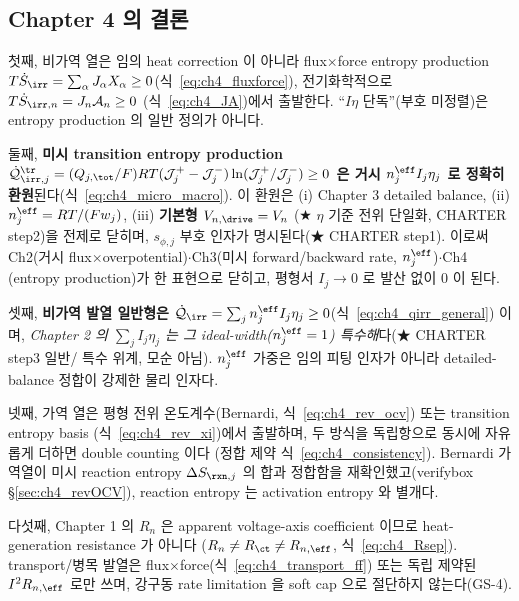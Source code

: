 \subsection{Chapter 4 의 결론}\label{sec:ch4_concl}
첫째, 비가역 열은 임의 heat correction 이 아니라 flux$\times$force entropy production $T\dot S_\irr=\sum_\alpha
J_\alpha X_\alpha\ge0$(식~\eqref{eq:ch4_fluxforce}), 전기화학적으로 $T\dot S_{\irr,n}=J_n\mathcal A_n\ge0$
(식~\eqref{eq:ch4_JA})에서 출발한다. ``$I\eta$ 단독''(부호 미정렬)은 entropy production 의 일반 정의가 아니다.

둘째, \textbf{미시 transition entropy production $\dot{\mathcal Q}_{\irr,j}^{\tr}=(Q_{j,\tot}/F)RT(\mathcal J_j^+-\mathcal J_j^-)
\ln(\mathcal J_j^+/\mathcal J_j^-)\ge0$ 은 거시 $n_j^{\eff}I_j\eta_j$ 로 정확히 환원}된다(식~\eqref{eq:ch4_micro_macro}).
이 환원은 (i) Chapter 3 detailed balance, (ii) $n_j^{\eff}=RT/(Fw_j)$, (iii) \textbf{기본형 $V_{n,\drive}=V_n$}
(★ $\eta$ 기준 전위 단일화, CHARTER step2)을 전제로 닫히며, $s_{\phi,j}$ 부호 인자가 명시된다(★ CHARTER step1).
이로써 Ch2(거시 flux$\times$overpotential)$\cdot$Ch3(미시 forward/backward rate, $n_j^{\eff}$)$\cdot$Ch4
(entropy production)가 한 표현으로 닫히고, 평형서 $I_j\to0$ 로 발산 없이 0 이 된다.

셋째, \textbf{비가역 발열 일반형은 $\dot{\mathcal Q}_\irr=\sum_j n_j^{\eff}I_j\eta_j\ge0$}(식~\eqref{eq:ch4_qirr_general})
이며, \emph{Chapter 2 의 $\sum_j I_j\eta_j$ 는 그 ideal-width($n_j^{\eff}=1$) 특수해}다(★ CHARTER step3 일반/
특수 위계, 모순 아님). $n_j^{\eff}$ 가중은 임의 피팅 인자가 아니라 detailed-balance 정합이 강제한 물리 인자다.

넷째, 가역 열은 평형 전위 온도계수(Bernardi, 식~\eqref{eq:ch4_rev_ocv}) 또는 transition entropy basis
(식~\eqref{eq:ch4_rev_xi})에서 출발하며, 두 방식을 독립항으로 동시에 자유롭게 더하면 double counting 이다
(정합 제약 식~\eqref{eq:ch4_consistency}). Bernardi 가역열이 미시 reaction entropy $\Delta S_{\rxn,j}$ 의 합과
정합함을 재확인했고(verifybox \S\ref{sec:ch4_revOCV}), reaction entropy 는 activation entropy 와 별개다.

다섯째, Chapter 1 의 $R_n$ 은 apparent voltage-axis coefficient 이므로 heat-generation resistance 가 아니다
($R_n\ne R_\ct\ne R_{n,\eff}$, 식~\eqref{eq:ch4_Rsep}). transport/병목 발열은 flux$\times$force(식~\eqref{eq:ch4_transport_ff})
또는 독립 제약된 $I^2R_{n,\eff}$ 로만 쓰며, 강구동 rate limitation 을 soft cap 으로 절단하지 않는다(GS-4).


